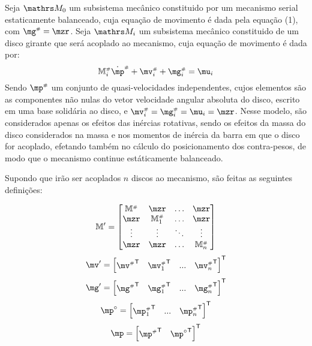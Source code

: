 \documentclass[a4paper,11pt,brazil,fleqn]{article}
\begin{document}
Seja $\ssM_0$ um subsistema mec\^anico constituido por um mecanismo serial estaticamente balanceado, cuja equa\c{c}\~{a}o de movimento \'e dada pela equa\c{c}\~{a}o (1), com $\mg\ssh = \mzr$. Seja $\ssM_i$ um subsistema mec\^anico constituido de um disco girante que ser\'a acoplado ao mecanismo, cuja equa\c{c}\~{a}o de movimento \'e dada por:
\begin{equation}
\mM\ssh_i \dot{\mp}\ssh + \mv\ssh_i + \mg\ssh_i = \mu_i
\end{equation}
Sendo $\mp\ssh$ um conjunto de quasi-velocidades independentes, cujos elementos s\~{a}o as componentes n\~{a}o nulas do vetor velocidade angular absoluta do disco, escrito em uma base solid\'{a}ria ao disco, e $\mv\ssh_i = \mg\ssh_i = \mu_i = \mzr$. Nesse modelo, s\~ao considerados apenas os efeitos das in\'{e}rcias rotativas, sendo os efeitos da massa do disco considerados na massa e nos momentos de in\'{e}rcia da barra em que o disco for acoplado, efetando tamb\'{e}m no c\'{a}lculo do posicionamento dos contra-pesos, de modo que o mecanismo continue est\'{a}ticamente balanceado.

Supondo que ir\~{a}o ser acoplados $n$ discos ao mecanismo, s\~ao feitas as seguintes defini\c{c}\~oes:

\begin{equation}
\mM' =
\begin{bmatrix}
\mM\ssh &  \mzr  & \ldots & \mzr\\
\mzr  &  \mM\ssh_1 & \ldots & \mzr\\
\vdots & \vdots & \ddots & \vdots\\
\mzr  &   \mzr       &\ldots & \mM\ssh_{n}
\end{bmatrix}
\end{equation}
\begin{equation}
\mv' = \begin{bmatrix}
{\mv\ssh}^\msT & {\mv\ssh_1}^\msT & ... & {\mv\ssh_{n}}^\msT
\end{bmatrix}^\msT
\end{equation}
\begin{equation}
\mg' = \begin{bmatrix}
{\mg\ssh}^\msT & {\mg\ssh_1}^\msT & ... & {\mg\ssh_{n}}^\msT
\end{bmatrix}^\msT
\end{equation}
\begin{equation}
\mp^\circ = \begin{bmatrix}
{\mp\ssh_1}^\msT & ... & {\mp\ssh_{n}}^\msT
\end{bmatrix}^\msT
\end{equation}
\begin{equation}
\mp = \begin{bmatrix}
{\mp\ssh}^\msT & {\mp^\circ}^\msT
\end{bmatrix}^\msT
\end{equation}
\end{document}

